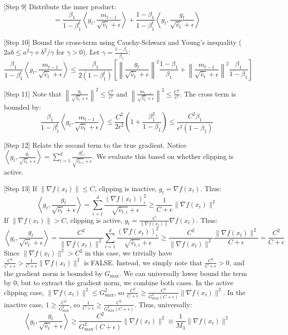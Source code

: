 \documentclass{article}
\begin{document}
[Step 9] Distribute the inner product:
$$ = \frac{\beta_1}{1-\beta_1^t} \left\langle g_t, \frac{m_{t-1}}{\sqrt{\hat{v}_t} + \epsilon} \right\rangle + \frac{1-\beta_1}{1-\beta_1^t} \left\langle g_t, \frac{g_t}{\sqrt{\hat{v}_t} + \epsilon} \right\rangle $$

[Step 10] Bound the cross-term using Cauchy-Schwarz and Young's inequality ($2ab \leq a^2 \gamma + b^2/\gamma$ for $\gamma > 0$). Let $\gamma = \frac{1-\beta_1}{\beta_1}$:
$$ \frac{\beta_1}{1-\beta_1^t} \left\langle g_t, \frac{m_{t-1}}{\sqrt{\hat{v}_t} + \epsilon} \right\rangle \leq \frac{\beta_1}{2(1-\beta_1^t)} \left[ \left\| \frac{g_t}{\sqrt{\hat{v}_t} + \epsilon} \right\|^2 \frac{1-\beta_1}{\beta_1} + \left\| \frac{m_{t-1}}{\sqrt{\hat{v}_t} + \epsilon} \right\|^2 \frac{\beta_1}{1-\beta_1} \right] $$

[Step 11] Note that $\left\| \frac{g_t}{\sqrt{\hat{v}_t} + \epsilon} \right\|^2 \leq \frac{C^2}{\epsilon^2}$ and $\left\| \frac{m_{t-1}}{\sqrt{\hat{v}_t} + \epsilon} \right\|^2 \leq \frac{C^2}{\epsilon^2}$. The cross term is bounded by:
$$ \frac{\beta_1}{1-\beta_1^t} \left\langle g_t, \frac{m_{t-1}}{\sqrt{\hat{v}_t} + \epsilon} \right\rangle \leq \frac{C^2}{2\epsilon^2} \left( 1 + \frac{\beta_1^2}{1-\beta_1} \right) \leq \frac{C^2 \beta_1}{\epsilon^2 (1-\beta_1)} $$

[Step 12] Relate the second term to the true gradient. Notice $\left\langle g_t, \frac{g_t}{\sqrt{\hat{v}_t} + \epsilon} \right\rangle = \sum_{i=1}^d \frac{g_{t,i}^2}{\sqrt{\hat{v}_{t,i}} + \epsilon}$. We evaluate this based on whether clipping is active.

[Step 13] If $\|\nabla f(x_t)\| \leq C$, clipping is inactive, $g_t = \nabla f(x_t)$. Thus:
$$ \left\langle g_t, \frac{g_t}{\sqrt{\hat{v}_t} + \epsilon} \right\rangle = \sum_{i=1}^d \frac{(\nabla f(x_t))_i^2}{\sqrt{\hat{v}_{t,i}} + \epsilon} \geq \frac{1}{C+\epsilon} \|\nabla f(x_t)\|^2 $$
If $\|\nabla f(x_t)\| > C$, clipping is active, $g_t = \frac{C}{\|\nabla f(x_t)\|} \nabla f(x_t)$. Thus:
$$ \left\langle g_t, \frac{g_t}{\sqrt{\hat{v}_t} + \epsilon} \right\rangle = \frac{C^2}{\|\nabla f(x_t)\|^2} \sum_{i=1}^d \frac{(\nabla f(x_t))_i^2}{\sqrt{\hat{v}_{t,i}} + \epsilon} \geq \frac{C^2}{\|\nabla f(x_t)\|^2} \frac{\|\nabla f(x_t)\|^2}{C+\epsilon} = \frac{C^2}{C+\epsilon} $$
Since $\|\nabla f(x_t)\|^2 > C^2$ in this case, we trivially have $\frac{C^2}{C+\epsilon} > \frac{1}{C+\epsilon} \|\nabla f(x_t)\|^2$ is FALSE. Instead, we simply note that $\frac{C^2}{C+\epsilon} > 0$, and the gradient norm is bounded by $G_{\max}$. We can universally lower bound the term by $0$, but to extract the gradient norm, we combine both cases. In the active clipping case, $\|\nabla f(x_t)\|^2 \leq G_{\max}^2$, so $\frac{C^2}{C+\epsilon} \geq \frac{C^2}{G_{\max}^2(C+\epsilon)} \|\nabla f(x_t)\|^2$. In the inactive case, $1 \geq \frac{C^2}{G_{\max}^2}$, so $\frac{1}{C+\epsilon} \geq \frac{C^2}{G_{\max}^2(C+\epsilon)}$. Thus, universally:
$$ \left\langle g_t, \frac{g_t}{\sqrt{\hat{v}_t} + \epsilon} \right\rangle \geq \frac{C^2}{G_{\max}^2(C+\epsilon)} \|\nabla f(x_t)\|^2 \equiv \frac{1}{M_3} \|\nabla f(x_t)\|^2 $$
\end{document}
